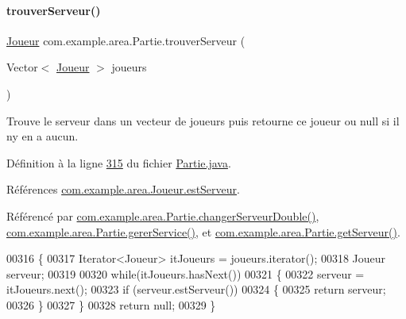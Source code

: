 \paragraph{\texorpdfstring{trouver\+Serveur()}{trouverServeur()}}
{\footnotesize\ttfamily \hyperlink{classcom_1_1example_1_1area_1_1_joueur}{Joueur} com.\+example.\+area.\+Partie.\+trouver\+Serveur (\begin{DoxyParamCaption}\item[{Vector$<$ \hyperlink{classcom_1_1example_1_1area_1_1_joueur}{Joueur} $>$}]{joueurs }\end{DoxyParamCaption})\hspace{0.3cm}{\ttfamily [private]}}



Trouve le serveur dans un vecteur de joueurs puis retourne ce joueur ou null si il n\textquotesingle{}y en a aucun. 



Définition à la ligne \hyperlink{_partie_8java_source_l00315}{315} du fichier \hyperlink{_partie_8java_source}{Partie.\+java}.



Références \hyperlink{_joueur_8java_source_l00026}{com.\+example.\+area.\+Joueur.\+est\+Serveur}.



Référencé par \hyperlink{_partie_8java_source_l00253}{com.\+example.\+area.\+Partie.\+changer\+Serveur\+Double()}, \hyperlink{_partie_8java_source_l00220}{com.\+example.\+area.\+Partie.\+gerer\+Service()}, et \hyperlink{_partie_8java_source_l00334}{com.\+example.\+area.\+Partie.\+get\+Serveur()}.


\begin{DoxyCode}
00316     \{
00317         Iterator<Joueur> itJoueurs = joueurs.iterator();
00318         Joueur serveur;
00319 
00320         \textcolor{keywordflow}{while}(itJoueurs.hasNext())
00321         \{
00322             serveur = itJoueurs.next();
00323             \textcolor{keywordflow}{if} (serveur.estServeur())
00324             \{
00325                 \textcolor{keywordflow}{return} serveur;
00326             \}
00327         \}
00328         \textcolor{keywordflow}{return} null;
00329     \}
\end{DoxyCode}
\mbox{\label{classcom_1_1example_1_1area_1_1_partie_ad07c65c2ba36cd08798cee1ba6b99c81}} 

